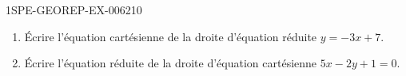 \begin{exercice}{1SPE-GEOREP-EX-006}{2}{10}
\begin{enumerate}
  \item Écrire l'équation cartésienne de la droite d'équation réduite $y = -3x + 7$.
  \item Écrire l'équation réduite de la droite d'équation cartésienne $5x - 2y + 1 = 0$.
\end{enumerate}
\end{exercice}
